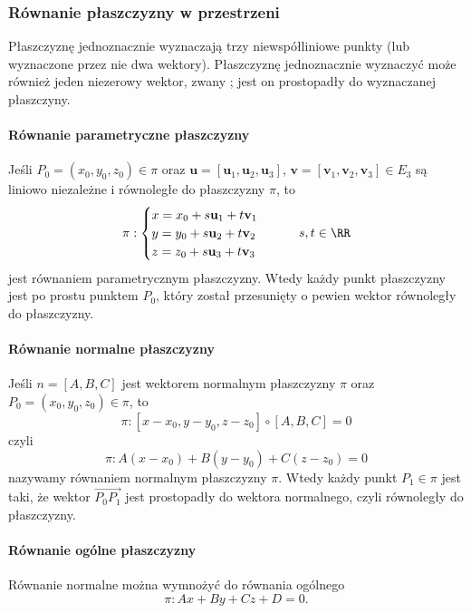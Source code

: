 \subsubsection{Równanie płaszczyzny w przestrzeni}
Płaszczyznę jednoznacznie wyznaczają trzy niewspółliniowe punkty (lub wyznaczone przez nie dwa wektory). Płaszczyznę jednoznacznie wyznaczyć może również jeden niezerowy wektor, zwany ; jest on prostopadły do wyznaczanej płaszczyny.

\paragraph{Równanie parametryczne płaszczyzny} Jeśli $P_0 = (x_0, y_0, z_0) \in \pi$ oraz $\mathbf{u} = [\mathbf{u}_1, \mathbf{u}_2, \mathbf{u}_3]$, $\mathbf{v} = [\mathbf{v}_1, \mathbf{v}_2, \mathbf{v}_3] \in E_3$ są liniowo niezależne i równoległe do płaszczyzny $\pi$, to
\begin{equation} \pi : \begin{cases}
    x = x_0 + s\mathbf{u}_1 + t\mathbf{v}_1 \\
    y = y_0 + s\mathbf{u}_2 + t\mathbf{v}_2 \\
    z = z_0 + s\mathbf{u}_3 + t\mathbf{v}_3
\end{cases} \qquad s, t \in \RR \end{equation}
jest równaniem parametrycznym płaszczyzny. Wtedy każdy punkt płaszczyzny jest po prostu punktem $P_0$, który został przesunięty o pewien wektor równoległy do płaszczyzny.

\paragraph{Równanie normalne płaszczyzny} Jeśli $n = [A, B, C]$ jest wektorem normalnym płaszczyzny $\pi$ oraz $P_0 = (x_0, y_0, z_0) \in \pi$, to
\[ \pi : [x - x_0, y - y_0, z - z_0] \circ [A, B, C] = 0 \]
czyli
\begin{equation}
    \pi : A(x - x_0) + B(y - y_0) + C(z - z_0) = 0
\end{equation}
nazywamy równaniem normalnym płaszczyzny $\pi$. Wtedy każdy punkt $P_1 \in \pi$ jest taki, że wektor $\overrightarrow{P_0P_1}$ jest prostopadły do wektora normalnego, czyli równoległy do płaszczyzny.

\paragraph{Równanie ogólne płaszczyzny} Równanie normalne można wymnożyć do równania ogólnego
\begin{equation}
    \pi : Ax + By + Cz + D = 0.
\end{equation}

